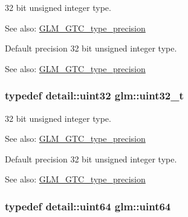 32 bit unsigned integer type. \begin{Desc}
\item[See also:]\hyperlink{group__gtc__type__precision}{GLM\_\-GTC\_\-type\_\-precision}\end{Desc}
Default precision 32 bit unsigned integer type. \begin{Desc}
\item[See also:]\hyperlink{group__gtc__type__precision}{GLM\_\-GTC\_\-type\_\-precision} \end{Desc}
\hypertarget{group__gtc__type__precision_g822ca53a9ad412504532838906276a99}{
\subsubsection[uint32\_\-t]{\setlength{\rightskip}{0pt plus 5cm}typedef detail::uint32 {\bf glm::uint32\_\-t}}}
\label{group__gtc__type__precision_g822ca53a9ad412504532838906276a99}


32 bit unsigned integer type. \begin{Desc}
\item[See also:]\hyperlink{group__gtc__type__precision}{GLM\_\-GTC\_\-type\_\-precision}\end{Desc}
Default precision 32 bit unsigned integer type. \begin{Desc}
\item[See also:]\hyperlink{group__gtc__type__precision}{GLM\_\-GTC\_\-type\_\-precision} \end{Desc}
\hypertarget{group__gtc__type__precision_ge3632bf9b37da66233d78930dd06378a}{
\subsubsection[uint64]{\setlength{\rightskip}{0pt plus 5cm}typedef detail::uint64 {\bf glm::uint64}}}
\label{group__gtc__type__precision_ge3632bf9b37da66233d78930dd06378a}


